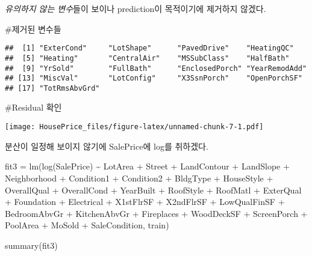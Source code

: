 \documentclass[
]{article}
\newenvironment{Shaded}{\begin{snugshade}}{\end{snugshade}}
\newcommand{\FunctionTok}[1]{\textcolor[rgb]{0.00,0.00,0.00}{#1}}
\newcommand{\NormalTok}[1]{#1}
\newcommand{\OtherTok}[1]{\textcolor[rgb]{0.56,0.35,0.01}{#1}}
\newcommand{\SpecialCharTok}[1]{\textcolor[rgb]{0.00,0.00,0.00}{#1}}
\begin{document}
\emph{유의하지 않는 변수}들이 보이나 prediction이 목적이기에 제거하지
않겠다.

\#제거된 변수들

\begin{Shaded}
\end{Shaded}

\begin{verbatim}
##  [1] "ExterCond"     "LotShape"      "PavedDrive"    "HeatingQC"    
##  [5] "Heating"       "CentralAir"    "MSSubClass"    "HalfBath"     
##  [9] "YrSold"        "FullBath"      "EnclosedPorch" "YearRemodAdd" 
## [13] "MiscVal"       "LotConfig"     "X3SsnPorch"    "OpenPorchSF"  
## [17] "TotRmsAbvGrd"
\end{verbatim}

\#Residual 확인

\begin{Shaded}
\end{Shaded}

\texttt{[image: HousePrice\_files/figure-latex/unnamed-chunk-7-1.pdf]}

분산이 일정해 보이지 않기에 SalePrice에 log를 취하겠다.

\begin{Shaded}
\begin{Highlighting}[]
\NormalTok{fit3 }\OtherTok{=} \FunctionTok{lm}\NormalTok{(}\FunctionTok{log}\NormalTok{(SalePrice) }\SpecialCharTok{\textasciitilde{}}\NormalTok{  LotArea }\SpecialCharTok{+}\NormalTok{ Street }\SpecialCharTok{+}\NormalTok{  LandContour }\SpecialCharTok{+}     
\NormalTok{              LandSlope }\SpecialCharTok{+}\NormalTok{ Neighborhood }\SpecialCharTok{+}\NormalTok{ Condition1 }\SpecialCharTok{+}\NormalTok{ Condition2 }\SpecialCharTok{+}\NormalTok{ BldgType }\SpecialCharTok{+}\NormalTok{ HouseStyle }\SpecialCharTok{+}\NormalTok{ OverallQual }\SpecialCharTok{+}  
\NormalTok{              OverallCond }\SpecialCharTok{+}\NormalTok{ YearBuilt }\SpecialCharTok{+}\NormalTok{  RoofStyle }\SpecialCharTok{+}\NormalTok{ RoofMatl }\SpecialCharTok{+}\NormalTok{ ExterQual }\SpecialCharTok{+}    
\NormalTok{              Foundation }\SpecialCharTok{+}\NormalTok{  Electrical }\SpecialCharTok{+}\NormalTok{ X1stFlrSF }\SpecialCharTok{+}\NormalTok{ X2ndFlrSF }\SpecialCharTok{+}    
\NormalTok{              LowQualFinSF }\SpecialCharTok{+}\NormalTok{  BedroomAbvGr }\SpecialCharTok{+}\NormalTok{  KitchenAbvGr }\SpecialCharTok{+} 
\NormalTok{              Fireplaces }\SpecialCharTok{+}\NormalTok{  WoodDeckSF }\SpecialCharTok{+}\NormalTok{ ScreenPorch }\SpecialCharTok{+}  
\NormalTok{              PoolArea }\SpecialCharTok{+}\NormalTok{  MoSold }\SpecialCharTok{+}\NormalTok{  SaleCondition, train)}

\FunctionTok{summary}\NormalTok{(fit3)}
\end{Highlighting}
\end{Shaded}
\end{document}

